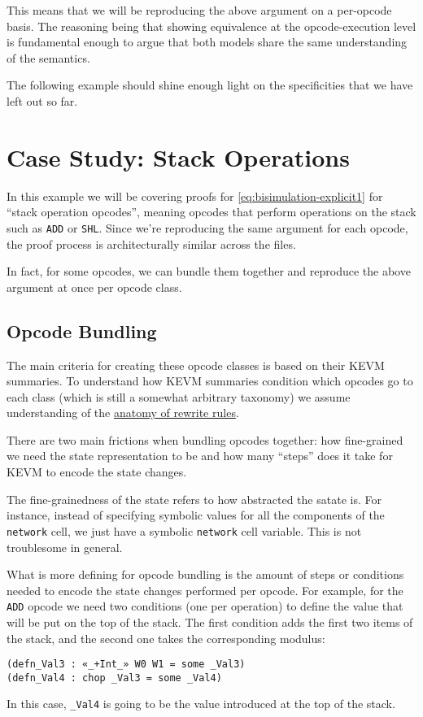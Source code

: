 This means that we will be reproducing the above argument on a per-opcode basis.
The reasoning being that showing equivalence at the opcode-execution level is
fundamental enough to argue that both models share the same understanding of the
semantics.

The following example should shine enough light on the
specificities that we have left out so far.

\section{Case Study: Stack Operations}

In this example we will be covering proofs for \ref{eq:bisimulation-explicit1}
for ``stack operation opcodes'', meaning opcodes that perform operations on the
stack such as \texttt{ADD} or \texttt{SHL}. Since we're reproducing the same
argument for each opcode, the proof process is architecturally similar across
the files.

In fact, for some opcodes, we can bundle them together and reproduce the above
argument at once per opcode class.

\subsection{Opcode Bundling}

The main criteria for creating these opcode classes is based on their KEVM
summaries. To understand how KEVM summaries condition which opcodes go to each
class (which is still a somewhat arbitrary taxonomy) we assume understanding of
the
\href{https://github.com/runtimeverification/evm-equivalence/tree/master/EvmEquivalence/Equivalence#anatomy-of-a-rewrite-rule}{anatomy
  of rewrite rules}.

There are two main frictions when bundling opcodes together: how fine-grained we
need the state representation to be and how many ``steps'' does it take for KEVM
to encode the state changes.

The fine-grainedness of the state refers to how abstracted the satate is. For
instance, instead of specifying symbolic values for all the components of the
\texttt{network} cell, we just have a symbolic \texttt{network} cell variable.
This is not troublesome in general.

What is more defining for opcode bundling is the amount of steps or conditions
needed to encode the state changes performed per opcode. For example, for the
\texttt{ADD} opcode we need two conditions (one per operation) to define the
value that will be put on the top of the stack. The first condition adds the
first two items of the stack, and the second one takes the corresponding
modulus:
\begin{verbatim}
(defn_Val3 : «_+Int_» W0 W1 = some _Val3)
(defn_Val4 : chop _Val3 = some _Val4)
\end{verbatim}
In this case, \texttt{_Val4} is going to be the value introduced at the top of
the stack.

